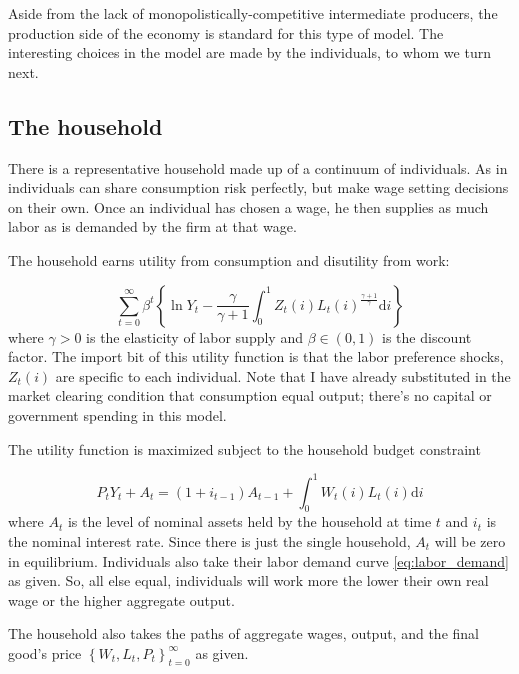 \documentclass[12pt,a4paper]{scrartcl}            %
\begin{document}
Aside from the lack of monopolistically-competitive intermediate producers, the production side of the economy is standard for this type of model.
The interesting choices in the model are made by the individuals, to whom we turn next.

\subsection{The household}
\label{sub:The household}

There is a representative household made up of a continuum of individuals.
As in \cite{erceg_henderson_levin_1999} individuals can share consumption risk perfectly, but make wage setting decisions on their own.
Once an individual has chosen a wage, he then supplies as much labor as is demanded by the firm at that wage.

The household earns utility from consumption and disutility from work:

\begin{equation} \label{eq:utility}
    \sum_{t=0}^{\infty} \beta^t \left\{\ln Y_t - \frac{\gamma}{\gamma + 1} \int_{0}^{1} Z_t(i)L_t(i)^{\frac{\gamma + 1}{\gamma}}\mathrm{d}i\right\}
\end{equation}
%
where $\gamma > 0$ is the elasticity of labor supply and $\beta \in (0, 1)$ is the discount factor.
The import bit of this utility function is that the labor preference shocks, $Z_t(i)$ are specific to each individual.
Note that I have already substituted in the market clearing condition that consumption equal output;
there's no capital or government spending in this model.

The utility function is maximized subject to the household budget constraint

\begin{equation}
    \label{eq:budget}
    P_t Y_t + A_t = \left(1 + i_{t-1}\right)A_{t-1} + \int_{0}^{1}\! W_t(i)L_t(i)\mathrm{d}i
\end{equation}
%
where $A_t$ is the level of nominal assets held by the household at time $t$ and $i_t$ is the nominal interest rate.
Since there is just the single household, $A_t$ will be zero in equilibrium.
Individuals also take their labor demand curve \eqref{eq:labor_demand} as given.
So, all else equal, individuals will work more the lower their own real wage or the higher aggregate output.

The household also takes the paths of aggregate wages, output, and the final good's price $\left\{W_t, L_t, P_t \right\}_{t=0}^{\infty}$ as given.
\end{document}
